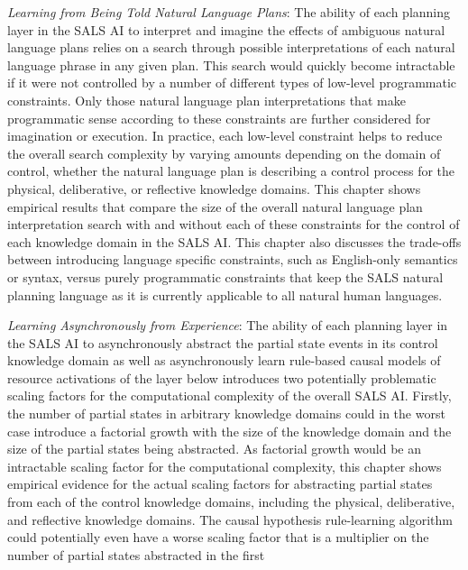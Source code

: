 \begin{packed_enumerate}
\item{\emph{Learning from Being Told Natural Language Plans}: The
  ability of each planning layer in the SALS AI to interpret and
  imagine the effects of ambiguous natural language plans relies on a
  search through possible interpretations of each natural language
  phrase in any given plan.  This search would quickly become
  intractable if it were not controlled by a number of different types
  of low-level programmatic constraints.  Only those natural language
  plan interpretations that make programmatic sense according to these
  constraints are further considered for imagination or execution.  In
  practice, each low-level constraint helps to reduce the overall
  search complexity by varying amounts depending on the domain of
  control, whether the natural language plan is describing a control
  process for the physical, deliberative, or reflective knowledge
  domains.  This chapter shows empirical results that compare the size
  of the overall natural language plan interpretation search with and
  without each of these constraints for the control of each knowledge
  domain in the SALS AI.  This chapter also discusses the trade-offs
  between introducing language specific constraints, such as
  English-only semantics or syntax, versus purely programmatic
  constraints that keep the SALS natural planning language as it is
  currently applicable to all natural human languages.}
\item{\emph{Learning Asynchronously from Experience}: The ability of
  each planning layer in the SALS AI to asynchronously abstract the
  partial state events in its control knowledge domain as well as
  asynchronously learn rule-based causal models of resource
  activations of the layer below introduces two potentially
  problematic scaling factors for the computational complexity of the
  overall SALS AI.  Firstly, the number of partial states in arbitrary
  knowledge domains could in the worst case introduce a factorial
  growth with the size of the knowledge domain and the size of the
  partial states being abstracted.  As factorial growth would be an
  intractable scaling factor for the computational complexity, this
  chapter shows empirical evidence for the actual scaling factors for
  abstracting partial states from each of the control knowledge
  domains, including the physical, deliberative, and reflective
  knowledge domains.  The causal hypothesis rule-learning algorithm
  could potentially even have a worse scaling factor that is a
  multiplier on the number of partial states abstracted in the first
}
\end{packed_enumerate}
